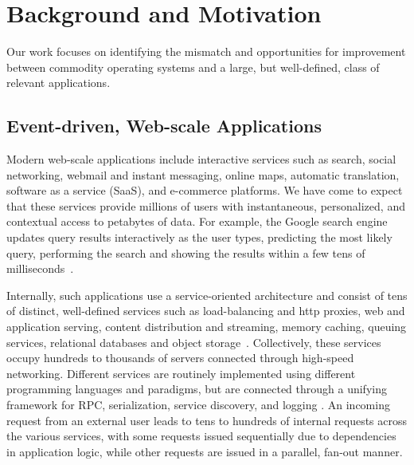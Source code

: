 
\section{Background and Motivation}
\label{sec:motivation}

Our work focuses on identifying the mismatch and opportunities for
improvement between commodity operating systems and a large, but
well-defined, class of relevant applications.

\subsection{Event-driven, Web-scale Applications}
\label{sec:motivation:web}

Modern web-scale applications include interactive services such as
search, social networking, webmail and instant messaging, online maps,
automatic translation, software as a service (SaaS), and e-commerce
platforms.  We have come to expect that these services provide
millions of users with instantaneous, personalized, and contextual
access to petabytes of data.  For example, the Google search engine
updates query results interactively as the user types, predicting the
most likely query, performing the search and showing the results
within a few tens of milliseconds~\cite{DBLP:journals/cacm/DeanB13}.

Internally, such applications use a service-oriented architecture and
consist of tens of distinct, well-defined services such as
load-balancing and http proxies, web and application serving, content
distribution and streaming, memory caching, queuing services,
relational databases and object
storage~\cite{Alonso:2010:WSC,Eriksen:2013:YSF}.  Collectively, these services occupy
hundreds to thousands of servers connected through high-speed
networking. Different services are routinely implemented using
different programming languages and paradigms, but are connected
through a unifying framework for RPC, serialization, service
discovery, and logging \cite{protocolbuffers, thrift, fingale,
  others}. An incoming request from an external user leads to tens to
hundreds of internal requests across the various services, with some
requests issued sequentially due to dependencies in application logic,
while other requests are issued in a parallel, fan-out manner.

